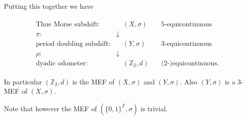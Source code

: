 \begin{frame}
	Putting this together we have
	\medskip
	
	\begin{align*}
		\begin{array}{rcc}
			\text{Thue Morse subshift:} &\quad (X, \sigma) \quad &5\text{-equicontinuous}\\
			\pi: &\downarrow &\\
			\text{period doubling subshift:} &\quad (Y, \sigma) \quad &3\text{-equicontinuous}\\
			\rho: &\downarrow &\\
			\text{dyadic odometer:} &\quad (\mathbb{Z}_2, d) \quad &\text{(2-)equicontinuous.}
		\end{array}
	\end{align*}\pause
	\medskip

	In particular $(\mathbb{Z}_2, d)$ is the MEF of $(X, \sigma)$ and $(Y, \sigma)$. Also $(Y, \sigma)$ is a $3$-MEF of $(X, \sigma)$.\pause
	
	Note that however the MEF of $(\{0, 1\}^\mathbb{Z}, \sigma)$ is trivial.
\end{frame}